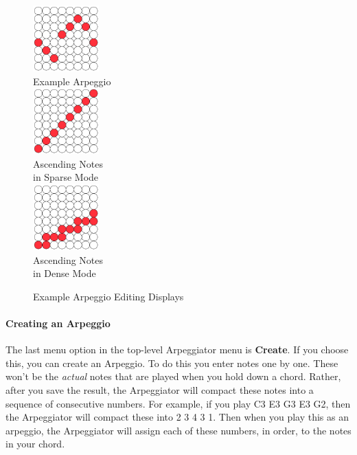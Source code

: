 \documentclass{article}
\begin{document}
\begin{figure}
\vspace{-1em}
\begin{center}
\vspace{-1.5em}\includegraphics[width=1in]{arpeggioexample.pdf}\\
Example Arpeggio\\[2em]
\vspace{-1.5em}\includegraphics[width=1in]{arpeggioup.pdf}\\
Ascending Notes\\in Sparse Mode\\[2em]
\vspace{-1.5em}\includegraphics[width=1in]{arpeggiodoubleup.pdf}\\
Ascending Notes\\in Dense Mode\\
\end{center}
\vspace{-1em}\caption{\small Example Arpeggio Editing Displays}
\label{arpeggioediting}
\end{figure}


\paragraph{Creating an Arpeggio}

The last menu option in the top-level Arpeggiator menu is {\bf Create}.  If you choose this, you can create an Arpeggio.  To do this you enter notes one by one.  These won't be the {\it actual} notes that are played when you hold down a chord.  Rather, after you save the result, the Arpeggiator will compact these notes into a sequence of consecutive numbers.  For example, if you play C3 E3 G3 E3 G2, then the Arpeggiator will compact these into 2 3 4 3 1.  Then when you play this as an arpeggio, the Arpeggiator will assign each of these numbers, in order, to the notes in your chord. 
\end{document}
